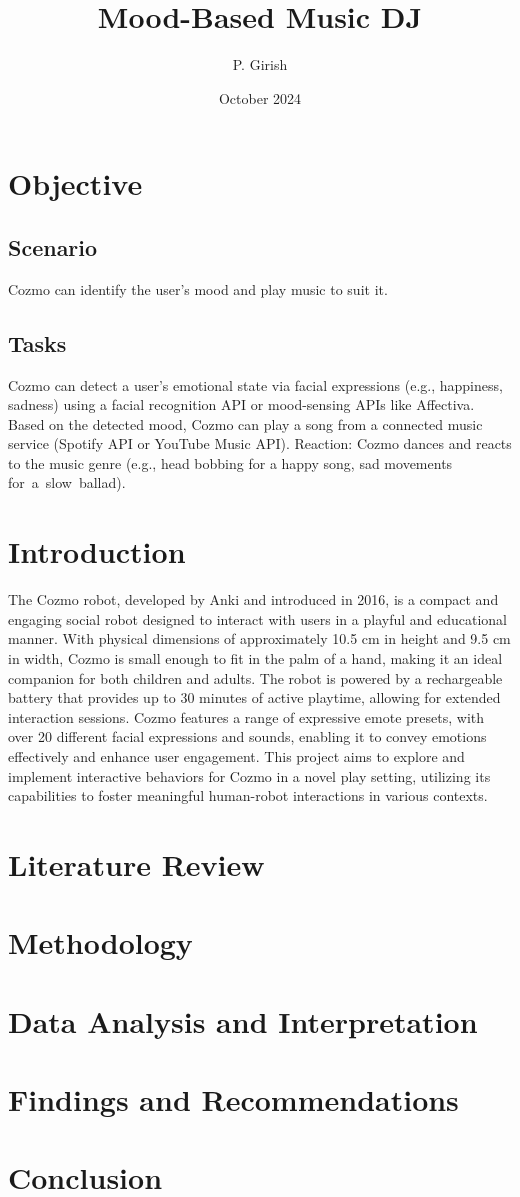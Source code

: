 \documentclass{article}
\title{Mood-Based Music DJ}
\author{P. Girish}
\date{October 2024}
\begin{document}
\maketitle

\section{Objective}
 \subsection{Scenario}
Cozmo can identify the user’s mood and play music to suit it.

\subsection{Tasks}
Cozmo can detect a user's emotional state via facial expressions (e.g., happiness, sadness) using a facial recognition API or mood-sensing APIs like Affectiva.
Based on the detected mood, Cozmo can play a song from a connected music service (Spotify API or YouTube Music API).
Reaction: Cozmo dances and reacts to the music genre (e.g., head bobbing for a happy song, sad movements for a slow ballad).

\section{Introduction} 
The Cozmo robot, developed by Anki and introduced in 2016, is a compact and engaging social robot designed to interact with users in a playful and educational manner. With physical dimensions of approximately 10.5 cm in height and 9.5 cm in width, Cozmo is small enough to fit in the palm of a hand, making it an ideal companion for both children and adults. The robot is powered by a rechargeable battery that provides up to 30 minutes of active playtime, allowing for extended interaction sessions. Cozmo features a range of expressive emote presets, with over 20 different facial expressions and sounds, enabling it to convey emotions effectively and enhance user engagement. This project aims to explore and implement interactive behaviors for Cozmo in a novel play setting, utilizing its capabilities to foster meaningful human-robot interactions in various contexts.

\section{Literature Review}
\section{Methodology}
\section{Data Analysis and Interpretation}
\section{Findings and Recommendations}
\section{Conclusion}
\end{document}
